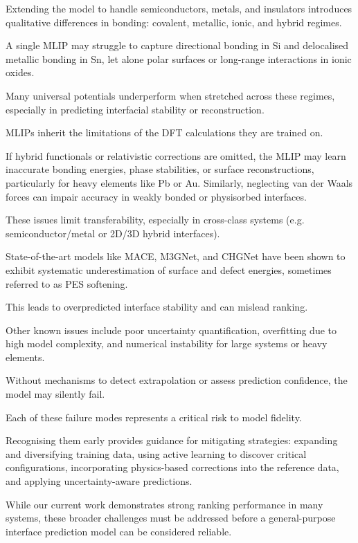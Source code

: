 Extending the model to handle semiconductors, metals, and insulators introduces qualitative differences in bonding:
covalent, metallic, ionic, and hybrid regimes.

A single MLIP may struggle to capture directional bonding in Si and delocalised metallic bonding in Sn, let alone polar
surfaces or long-range interactions in ionic oxides.

Many universal potentials underperform when stretched across these regimes, especially in predicting interfacial
stability or reconstruction.


MLIPs inherit the limitations of the DFT calculations they are trained on.

If hybrid functionals or relativistic corrections are omitted, the MLIP may learn inaccurate bonding energies, phase
stabilities, or surface reconstructions, particularly for heavy elements like Pb or Au. Similarly, neglecting van der
Waals forces can impair accuracy in weakly bonded or physisorbed interfaces.

These issues limit transferability, especially in cross-class systems (e.g. semiconductor/metal or 2D/3D hybrid
interfaces).


State-of-the-art models like MACE, M3GNet, and CHGNet have been shown to exhibit systematic underestimation of surface
and defect energies, sometimes referred to as PES softening.

This leads to overpredicted interface stability and can mislead ranking.

Other known issues include poor uncertainty quantification, overfitting due to high model complexity, and numerical
instability for large systems or heavy elements.

Without mechanisms to detect extrapolation or assess prediction confidence, the model may silently fail.


Each of these failure modes represents a critical risk to model fidelity.

Recognising them early provides guidance for mitigating strategies: expanding and diversifying training data, using
active learning to discover critical configurations, incorporating physics-based corrections into the reference data,
and applying uncertainty-aware predictions.

While our current work demonstrates strong ranking performance in many systems, these broader challenges must be
addressed before a general-purpose interface prediction model can be considered reliable.

